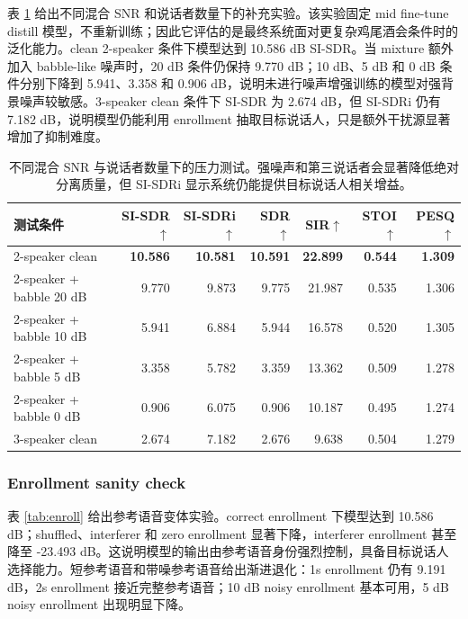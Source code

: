 \documentclass[UTF8,zihao=5,a4paper]{ctexart}
\newcommand{\sisdr}{SI-SDR}
\begin{document}
表 \ref{tab:stress} 给出不同混合 SNR 和说话者数量下的补充实验。该实验固定 mid fine-tune distill 模型，不重新训练；因此它评估的是最终系统面对更复杂鸡尾酒会条件时的泛化能力。clean 2-speaker 条件下模型达到 10.586 dB \sisdr{}。当 mixture 额外加入 babble-like 噪声时，20 dB 条件仍保持 9.770 dB；10 dB、5 dB 和 0 dB 条件分别下降到 5.941、3.358 和 0.906 dB，说明未进行噪声增强训练的模型对强背景噪声较敏感。3-speaker clean 条件下 \sisdr{} 为 2.674 dB，但 \sisdr{}i 仍有 7.182 dB，说明模型仍能利用 enrollment 抽取目标说话人，只是额外干扰源显著增加了抑制难度。

\begin{table}[H]
\centering
\small
\begin{tabular}{lrrrrrr}
\toprule
测试条件 & \sisdr{}$\uparrow$ & \sisdr{}i$\uparrow$ & SDR$\uparrow$ & SIR$\uparrow$ & STOI$\uparrow$ & PESQ$\uparrow$ \\
\midrule
2-speaker clean & \textbf{10.586} & \textbf{10.581} & \textbf{10.591} & \textbf{22.899} & \textbf{0.544} & \textbf{1.309} \\
2-speaker + babble 20 dB & 9.770 & 9.873 & 9.775 & 21.987 & 0.535 & 1.306 \\
2-speaker + babble 10 dB & 5.941 & 6.884 & 5.944 & 16.578 & 0.520 & 1.305 \\
2-speaker + babble 5 dB & 3.358 & 5.782 & 3.359 & 13.362 & 0.509 & 1.278 \\
2-speaker + babble 0 dB & 0.906 & 6.075 & 0.906 & 10.187 & 0.495 & 1.274 \\
3-speaker clean & 2.674 & 7.182 & 2.676 & 9.638 & 0.504 & 1.279 \\
\bottomrule
\end{tabular}
\normalsize
\caption{不同混合 SNR 与说话者数量下的压力测试。强噪声和第三说话者会显著降低绝对分离质量，但 \sisdr{}i 显示系统仍能提供目标说话人相关增益。}
\label{tab:stress}
\end{table}

\subsubsection{Enrollment sanity check}

表 \ref{tab:enroll} 给出参考语音变体实验。correct enrollment 下模型达到 10.586 dB；shuffled、interferer 和 zero enrollment 显著下降，interferer enrollment 甚至降至 -23.493 dB。这说明模型的输出由参考语音身份强烈控制，具备目标说话人选择能力。短参考语音和带噪参考语音给出渐进退化：1s enrollment 仍有 9.191 dB，2s enrollment 接近完整参考语音；10 dB noisy enrollment 基本可用，5 dB noisy enrollment 出现明显下降。
\end{document}
